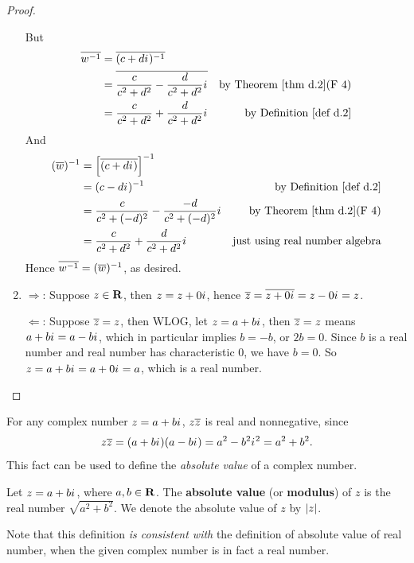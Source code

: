 \begin{proof}
\begin{enumerate}
But
\begin{align*}
    \conjugatet{w^{-1}} & = \conjugatet{(c + d\iu)^{-1}} \\
    & = \conjugatet{\frac{c}{c^2 + d^2} - \frac{d}{c^2 + d^2}\iu} & \text{by \THM{d.2}(F 4)} \\
    & = \frac{c}{c^2 + d^2} + \frac{d}{c^2 + d^2}\iu & \text{by \DEF{d.2}}
\end{align*}
And
\begin{align*}
    (\conjugatet{w})^{-1} & = \left[ \conjugatet{(c + d\iu)} \right]^{-1} \\
    & = (c - d\iu)^{-1} & \text{by \DEF{d.2}} \\
    & = \frac{c}{c^2 + (-d)^2} - \frac{-d}{c^2 + (-d)^2}\iu & \text{by \THM{d.2}(F 4)} \\
    & = \frac{c}{c^2 + d^2} + \frac{d}{c^2 + d^2}\iu & \text{just using real number algebra}
\end{align*}
Hence \(\overline{w^{-1}} = (\overline{w})^{-1}\), as desired.

\item
\(\Longrightarrow\): Suppose \(z \in \mathbf{R}\), then \(z = z + 0{i\mkern1mu}\), hence \(\overline{z} = \overline{z + 0{i\mkern1mu}} = z - 0{i\mkern1mu} = z\).

\(\Longleftarrow\): Suppose \(\overline{z} = z\), then WLOG, let \(z = a + b{i\mkern1mu}\),
then \(\overline{z} = z\) means \(a + b{i\mkern1mu} = a - b{i\mkern1mu}\), which in particular implies \(b = -b\), or \(2b = 0\).
Since \(b\) is a real number and real number has characteristic \(0\), we have \(b = 0\).
So \(z = a + b{i\mkern1mu} = a + 0{i\mkern1mu} = a\), which is a real number.
\end{enumerate}
\end{proof}

\begin{remark} \label{remark d.4}
For any complex number \(z = a + b{i\mkern1mu}\), \(z\overline{z}\) is real and nonnegative, since
\[
    z\overline{z} = (a + b{i\mkern1mu})(a - b{i\mkern1mu}) = a^2 - b^2{i\mkern1mu}^2 = a^2 + b^2.
\]
This fact can be used to define the \emph{absolute value} of a complex number.
\end{remark}

\begin{appendix definition} \label{def d.3}
Let \(z = a + b{i\mkern1mu}\), where \(a, b \in \mathbf{R}\).
The \textbf{absolute value} (or \textbf{modulus}) of \(z\) is the real number \(\sqrt{a^2 + b^2}\).
We denote the absolute value of \(z\) by \(\lvert z\rvert\).

Note that this definition \emph{is consistent with} the definition of absolute value of real number, when the given complex number is in fact a real number.
\end{appendix definition}

